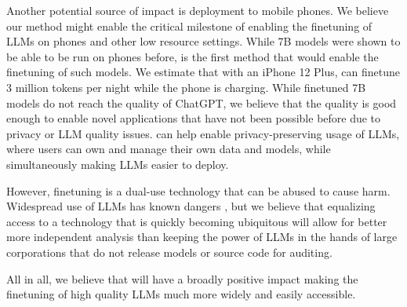 Another potential source of impact is deployment to mobile phones. We believe our \method method might enable the critical milestone of enabling the finetuning of LLMs on phones and other low resource settings. While 7B models were shown to be able to be run on phones before, \method is the first method that would enable the finetuning of such models. We estimate that with an iPhone 12 Plus, \method can finetune 3 million tokens per night while the phone is charging. While finetuned 7B models do not reach the quality of ChatGPT, we believe that the quality is good enough to enable novel applications that have not been possible before due to privacy or LLM quality issues. \method can help enable privacy-preserving usage of LLMs, where users can own and manage their own data and models, while simultaneously making LLMs easier to deploy.

However, finetuning is a dual-use technology that can be abused to cause harm. Widespread use of LLMs has known dangers \citep{bommasani2021opportunities,bender2021dangers}, but we believe that equalizing access to a technology that is quickly becoming ubiquitous will allow for better more independent analysis than keeping the power of LLMs in the hands of large corporations that do not release models or source code for auditing.

All in all, we believe that \method will have a broadly positive impact making the finetuning of high quality LLMs much more widely and easily accessible.


